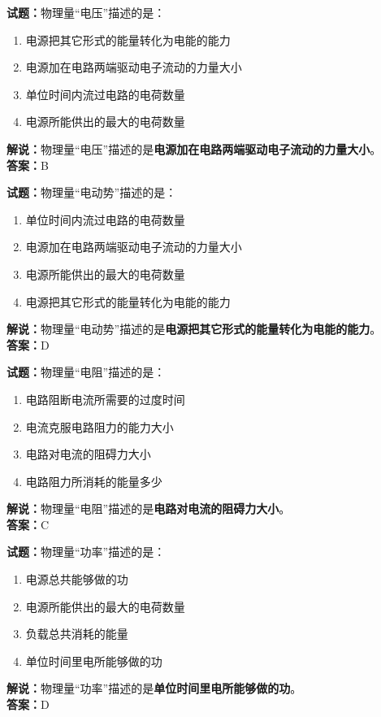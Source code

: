 \documentclass{ctexbook}
\begin{document}
\vspace{1em}

\textbf{试题：}物理量“电压”描述的是：
\begin{enumerate}[leftmargin=3em]
  \item 电源把其它形式的能量转化为电能的能力
  \item 电源加在电路两端驱动电子流动的力量大小
  \item 单位时间内流过电路的电荷数量
  \item 电源所能供出的最大的电荷数量
\end{enumerate}
\noindent\textbf{解说：}物理量“电压”描述的是\textbf{电源加在电路两端驱动电子流动的力量大小}。\\\noindent\textbf{答案：}B

\vspace{1em}

\textbf{试题：}物理量“电动势”描述的是：
\begin{enumerate}[leftmargin=3em]
  \item 单位时间内流过电路的电荷数量
  \item 电源加在电路两端驱动电子流动的力量大小
  \item 电源所能供出的最大的电荷数量
  \item 电源把其它形式的能量转化为电能的能力
\end{enumerate}
\noindent\textbf{解说：}物理量“电动势”描述的是\textbf{电源把其它形式的能量转化为电能的能力}。\\\noindent\textbf{答案：}D

\vspace{1em}

\textbf{试题：}物理量“电阻”描述的是：
\begin{enumerate}[leftmargin=3em]
  \item 电路阻断电流所需要的过度时间
  \item 电流克服电路阻力的能力大小
  \item 电路对电流的阻碍力大小
  \item 电路阻力所消耗的能量多少
\end{enumerate}
\noindent\textbf{解说：}物理量“电阻”描述的是\textbf{电路对电流的阻碍力大小}。\\\noindent\textbf{答案：}C

\vspace{1em}

\textbf{试题：}物理量“功率”描述的是：
\begin{enumerate}[leftmargin=3em]
  \item 电源总共能够做的功
  \item 电源所能供出的最大的电荷数量
  \item 负载总共消耗的能量
  \item 单位时间里电所能够做的功
\end{enumerate}
\noindent\textbf{解说：}物理量“功率”描述的是\textbf{单位时间里电所能够做的功}。\\\noindent\textbf{答案：}D
\end{document}
